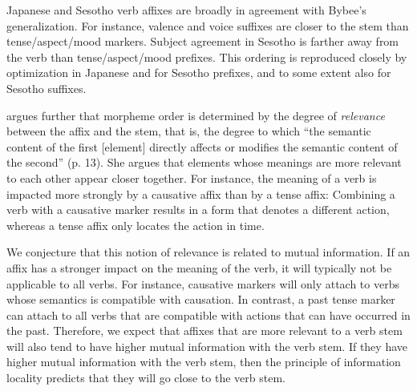 Japanese and Sesotho verb affixes are broadly in agreement with Bybee's generalization.
For instance, valence and voice suffixes are closer to the stem than tense/aspect/mood markers.
Subject agreement in Sesotho is farther away from the verb than tense/aspect/mood prefixes.
This ordering is reproduced closely by optimization in Japanese and for Sesotho prefixes, and to some extent also for Sesotho suffixes.

\citet[p. 37]{bybee-morphology-1985} argues further that morpheme order is determined by the degree of \emph{relevance} between the affix and the stem, that is, the degree to which ``the semantic content of the first [element] directly affects or modifies the semantic content of the second'' (p. 13).
She argues that elements whose meanings are more relevant to each other appear closer together.
For instance, the meaning of a verb is impacted more strongly by a causative affix than by a tense affix:
Combining a verb with a causative marker results in a form that denotes a different action, whereas a tense affix only locates the action in time.

We conjecture that this notion of relevance is related to mutual information.
If an affix has a stronger impact on the meaning of the verb, it will typically not be applicable to all verbs.
For instance, causative markers will only attach to verbs whose semantics is compatible with causation.
In contrast, a past tense marker can attach to all verbs that are compatible with actions that can have occurred in the past.
Therefore, we expect that affixes that are more relevant to a verb stem will also tend to have higher mutual information with the verb stem.
If they have higher mutual information with the verb stem, then the principle of information locality predicts that they will go close to the verb stem.
